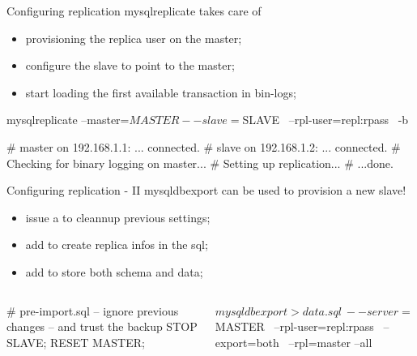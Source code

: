 \documentclass{beamer}[10]
\begin{document}
\begin{pyframe}{Configuring replication}
mysqlreplicate takes care of
\begin{itemize}
\item provisioning the replica user on the master;
\item configure the slave to point to the master;
\item start loading the first available transaction in bin-logs;
\end{itemize}

\begin{bashcode}
    mysqlreplicate  --master=$MASTER --slave=$SLAVE \
            --rpl-user=repl:rpass \
            -b

    # master on 192.168.1.1: ... connected.
    # slave on 192.168.1.2: ... connected.
    # Checking for binary logging on master...
    # Setting up replication...
    # ...done.
\end{bashcode}
\end{pyframe}


\begin{pyframe}{Configuring replication - II}
mysqldbexport can be used to provision a new slave!
\begin{itemize}
\item issue a  to cleannup previous settings;
\item add \code{--rpl=master} to create replica infos in the sql;
\item add \code{--export=both} to store both schema and data;
\end{itemize}

\begin{columns}

\begin{bashcode}
# pre-import.sql
-- ignore previous changes
-- and trust the backup
STOP SLAVE;
RESET MASTER;
\end{bashcode}

\begin{pycode}
$ mysqldbexport > data.sql \
 --server=$MASTER \
 --rpl-user=repl:rpass \
 --export=both \
 --rpl=master --all

\end{pycode}
\end{columns}

\end{pyframe}
\end{document}
